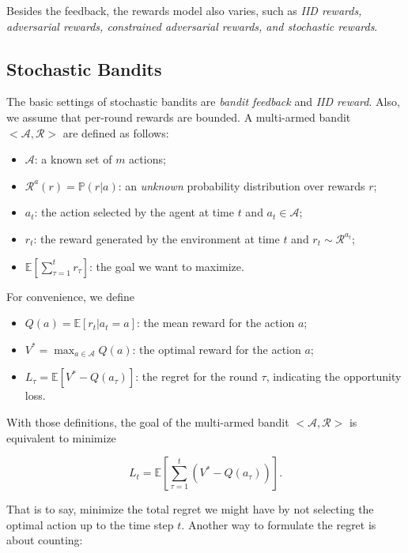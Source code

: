 \documentclass{progartcn}
\begin{document}
		Besides the feedback, the rewards model also varies, such as \textit{IID rewards, adversarial rewards, constrained adversarial rewards, and stochastic rewards}.\\

	\subsection{Stochastic Bandits}

		The basic settings of stochastic bandits are \textit{bandit feedback} and \textit{IID reward}. Also, we assume that per-round rewards are bounded. A multi-armed bandit $<\mathcal{A,R}>$ are defined as follows:

		\begin{itemize}[noitemsep,topsep=0pt]
		\item $\mathcal{A}$: a known set of $m$ actions;
		\item $\mathcal{R}^{a}(r)=\mathbb{P}(r|a)$: an \textit{unknown} probability distribution over rewards $r$;
		\item $a_t$: the action selected by the agent at time $t$ and $a_t\in \mathcal{A}$;
		\item $r_t$: the reward generated by the environment at time $t$ and $r_t\sim \mathcal{R}^{a_t}$;
		\item $\mathbb{E}\left[\sum_{\tau=1}^t r_{\tau}\right]$: the goal we want to maximize.\\
		\end{itemize}

		For convenience, we define

		\begin{itemize}[noitemsep,topsep=0pt]
		\item $Q(a)=\mathbb{E}[r_t|a_t=a]$: the mean reward for the action $a$;
		\item $V^\ast=\max_{a\in \mathcal{A}} Q(a)$: the optimal reward for the action $a$;
		\item $L_\tau=\mathbb{E}[V^\ast-Q(a_\tau)]$: the regret for the round $\tau$, indicating the opportunity loss.\\
		\end{itemize}

		With those definitions, the goal of the multi-armed bandit $<\mathcal{A,R}>$ is equivalent to minimize

		\[L_t=\mathbb{E}\left[\sum_{\tau=1}^t(V^\ast-Q(a_\tau))\right].\label{rl_regret}\]

		That is to say, minimize the total regret we might have by not selecting the optimal action up to the time step $t$. Another way to formulate the regret is about counting:
\end{document}
